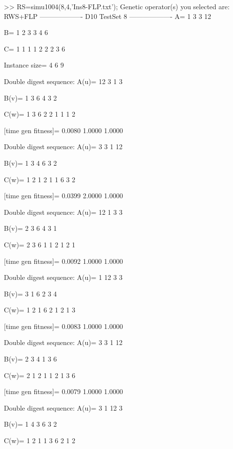 >> RS=simu1004(8,4,'Ins8-FLP.txt');
Genetic operator(s) you selected are:
RWS+FLP
------------------- D10 TestSet 8 -------------------
A=
     1     3     3    12

B=
     1     2     3     3     4     6

C=
     1     1     1     1     2     2     2     3     6

Instance size=
     4     6     9

Double digest sequence:
A(u)=
    12     3     1     3

B(v)=
     1     3     6     4     3     2

C(w)=
     1     3     6     2     2     1     1     1     2

[time gen fitness]=
    0.0080    1.0000    1.0000

Double digest sequence:
A(u)=
     3     3     1    12

B(v)=
     1     3     4     6     3     2

C(w)=
     1     2     1     2     1     1     6     3     2

[time gen fitness]=
    0.0399    2.0000    1.0000

Double digest sequence:
A(u)=
    12     1     3     3

B(v)=
     2     3     6     4     3     1

C(w)=
     2     3     6     1     1     2     1     2     1

[time gen fitness]=
    0.0092    1.0000    1.0000

Double digest sequence:
A(u)=
     1    12     3     3

B(v)=
     3     1     6     2     3     4

C(w)=
     1     2     1     6     2     1     2     1     3

[time gen fitness]=
    0.0083    1.0000    1.0000

Double digest sequence:
A(u)=
     3     3     1    12

B(v)=
     2     3     4     1     3     6

C(w)=
     2     1     2     1     1     2     1     3     6

[time gen fitness]=
    0.0079    1.0000    1.0000

Double digest sequence:
A(u)=
     3     1    12     3

B(v)=
     1     4     3     6     3     2

C(w)=
     1     2     1     1     3     6     2     1     2

